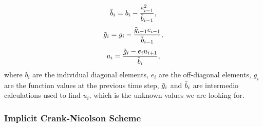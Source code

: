 \documentclass[reprint,english,notitlepage]{revtex4-1}  %
\begin{document}
\begin{equation}\label{eq:tri1}
    \Tilde{b}_i = b_i - \frac{e_{i-1}^2}{\Tilde{b}_{i-1}},
\end{equation}
\begin{equation}\label{eq:tri2}
    \Tilde{g}_i = g_i - \frac{\Tilde{g}_{i-1}e_{i-1}}{\Tilde{b}_{i-1}},
\end{equation}
\begin{equation}\label{eq:tri3}
    u_i = \frac{\Tilde{g}_i - e_i u_{i+1}}{\Tilde{b}_i},
\end{equation}
where $b_i$ are the individual diagonal elements, $e_i$ are the off-diagonal elements, $g_i$ are the function values at the previous time step, $\Tilde{g}_i$ and $\Tilde{b}_i$ are intermedio calculations used to find $u_i$, which is the unknown values we are looking for. 

\subsubsection{Implicit Crank-Nicolson Scheme}
\end{document}
